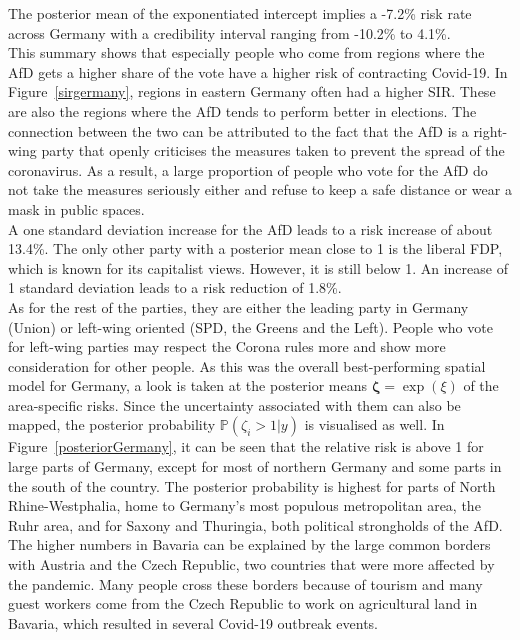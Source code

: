 The posterior mean of the exponentiated intercept implies a -7.2\% risk rate across Germany with a credibility interval ranging from -10.2\% to 4.1\%.  \\
This summary shows that especially people who come from regions where the AfD gets a higher share of the vote have a higher risk of contracting Covid-19. In Figure~\ref{sirgermany}, regions in eastern Germany often had a higher SIR. These are also the regions where the AfD tends to perform better in elections. The connection between the two can be attributed to the fact that the AfD is a right-wing party that openly criticises the measures taken to prevent the spread of the coronavirus. As a result, a large proportion of people who vote for the AfD do not take the measures seriously either and refuse to keep a safe distance or wear a mask in public spaces. \\
A one standard deviation increase for the AfD leads to a risk increase of about 13.4\%. The only other party with a posterior mean close to 1 is the liberal FDP, which is known for its capitalist views. However, it is still below 1. An increase of 1 standard deviation leads to a risk reduction of 1.8\%. \\
As for the rest of the parties, they are either the leading party in Germany (Union) or left-wing oriented (SPD, the Greens and the Left). People who vote for left-wing parties may respect the Corona rules more and show more consideration for other people.
As this was the overall best-performing spatial model for Germany, a look is taken at the posterior means $\pmb{\zeta} = \exp{\left(\xi\right)}$ of the area-specific risks. Since the uncertainty associated with them can also be mapped, the posterior probability $\mathbb{P}\left(\zeta_i > 1|y\right)$ is visualised as well. In Figure~\ref{posteriorGermany}, it can be seen that the relative risk is above 1 for large parts of Germany, except for most of northern Germany and some parts in the south of the country. The posterior probability is highest for parts of North Rhine-Westphalia, home to Germany's most populous metropolitan area, the Ruhr area, and for Saxony and Thuringia, both political strongholds of the AfD. The higher numbers in Bavaria can be explained by the large common borders with Austria and the Czech Republic, two countries that were more affected by the pandemic. Many people cross these borders because of tourism and many guest workers come from the Czech Republic to work on agricultural land in Bavaria, which resulted in several Covid-19 outbreak events.
